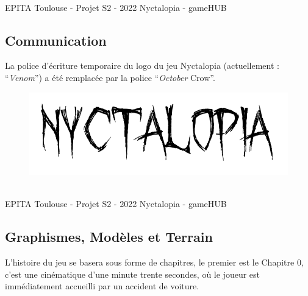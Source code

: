 \vfill
\noindent\makebox[\linewidth]{\rule{.8\paperwidth}{.6pt}}\\[0.2cm]
EPITA Toulouse - Projet S2 - 2022 \hfill Nyctalopia - gameHUB
\noindent\makebox[\linewidth]{\rule{.8\paperwidth}{.6pt}}


\subsection{Communication}
\setlength{\parindent}{5ex}

La police d'écriture temporaire du logo du jeu Nyctalopia (actuellement : ``\emph{Venom}'') a été remplacée par la police ``\emph{October} Crow''.

\begin{figure}[H]
\centering
\begin{minipage}{.5\textwidth}
  \centering
  \centerline{\includegraphics[width=1.5\linewidth]{img/font.png}}
  \label{fig:octobercrowfont}
\end{minipage}%
\end{figure}

\vfill
\noindent\makebox[\linewidth]{\rule{.8\paperwidth}{.6pt}}\\[0.2cm]
EPITA Toulouse - Projet S2 - 2022 \hfill Nyctalopia - gameHUB
\noindent\makebox[\linewidth]{\rule{.8\paperwidth}{.6pt}}

\subsection{Graphismes, Modèles et Terrain}
\setlength{\parindent}{5ex}
L'histoire du jeu se basera sous forme de chapitres, le premier est le Chapitre 0, c'est une cinématique d'une minute trente secondes, où le joueur est immédiatement accueilli par un accident de voiture.

